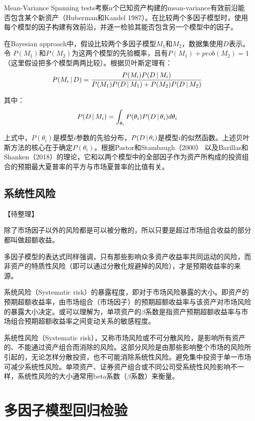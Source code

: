 \documentclass[11pt]{article}
\begin{document}
Mean-Variance Spanning tests考察n个已知资产构建的mean-variance有效前沿能否包含某个新资产（Huberman和Kandel 1987）。在比较两个多因子模型时，使用每个模型的因子构建有效前沿，并逐一检验其能否包含另一个模型中的因子。

在Bayesian approach中，假设比较两个多因子模型$M_1$和$M_2$，数据集使用$D$表示。令 $P(M_1)$和$P(M_2)$为这两个模型的先验概率，且有$P(M_1) + prob(M_2) = 1$（这里假设把多个模型两两比较）。根据贝叶斯定理有：
\begin{equation*}
    P(M_i \,\vert\, D) = \frac{P(M_i)P(D \,\vert\, M_i)}{P(M_1)P(D\,\vert\, M_1) + P(M_2)P(D\,\vert\, M_2)}
\end{equation*}

其中：
\begin{equation*}
    P(D \,\vert\, M_i) = \int_{\theta_i} P(\theta_i) P(D \,\vert\, \theta_i) d\theta_i
\end{equation*}

上式中，$P(\theta_i)$是模型$i$参数的先验分布，$P(D \,\vert\, \theta_i)$是模型$i$的似然函数。上述贝叶斯方法的核心在于确定$P(\theta_i)$。根据Pastor和Stambaugh（2000） 以及Barillas和Shanken（2018）的理论，它和以两个模型中的全部因子作为资产所构成的投资组合的预期最大夏普率的平方与市场夏普率的比值有关。

\subsection{系统性风险}

【待整理】

除了市场因子以外的风险都是可以被分散的，所以只要是超过市场组合收益的部分都叫做超额收益。

多因子模型的表达式同样强调，只有那些影响众多资产收益率共同运动的风险，而非资产的特质性风险（即可以通过分散化规避掉的风险），才是预期收益率的来源。

系统风险（Systematic risk）的暴露程度，即对于市场风险暴露的大小。即资产的预期超额收益率，由市场组合（市场因子）的预期超额收益率与该资产对市场风险的暴露大小决定。或可以理解为，单项资产的$\beta$系数是指资产预期超额收益率与市场组合预期超额收益率之间变动关系的敏感程度。

系统性风险（Systematic risk），又称市场风险或不可分散风险，是影响所有资产的、不能通过资产组合而消除的风险。这部分风险是由那些影响整个市场的风险所引起的，无论怎样分散投资，也不可能消除系统性风险。避免集中投资于单一市场可减少系统性风险。单项资产、证券资产组合或不同公司受系统性风险影响不一样，系统性风险的大小通常用beta系数（$\beta$系数）来衡量。

\section{多因子模型回归检验}
\end{document}
